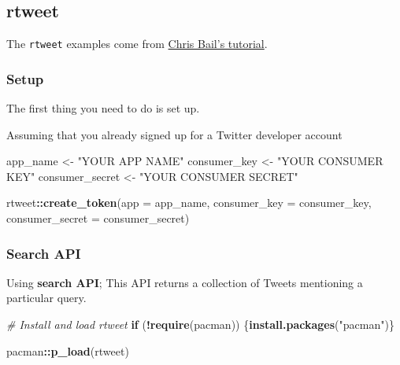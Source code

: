 \documentclass[
]{book}
\newenvironment{Shaded}{\begin{snugshade}}{\end{snugshade}}
\newcommand{\CommentTok}[1]{\textcolor[rgb]{0.56,0.35,0.01}{\textit{#1}}}
\newcommand{\ControlFlowTok}[1]{\textcolor[rgb]{0.13,0.29,0.53}{\textbf{#1}}}
\newcommand{\DataTypeTok}[1]{\textcolor[rgb]{0.13,0.29,0.53}{#1}}
\newcommand{\KeywordTok}[1]{\textcolor[rgb]{0.13,0.29,0.53}{\textbf{#1}}}
\newcommand{\NormalTok}[1]{#1}
\newcommand{\OperatorTok}[1]{\textcolor[rgb]{0.81,0.36,0.00}{\textbf{#1}}}
\newcommand{\StringTok}[1]{\textcolor[rgb]{0.31,0.60,0.02}{#1}}
\begin{document}
\hypertarget{rtweet}{%
\subsection{rtweet}\label{rtweet}}

The \texttt{rtweet} examples come from \href{https://cbail.github.io/SICSS_APIs_markdown.html}{Chris Bail's tutorial}.

\hypertarget{setup-5}{%
\subsubsection{Setup}\label{setup-5}}

The first thing you need to do is set up.

Assuming that you already signed up for a Twitter developer account

\begin{Shaded}
\begin{Highlighting}[]
\NormalTok{app\_name \textless{}{-}}\StringTok{ "YOUR APP NAME"}
\NormalTok{consumer\_key \textless{}{-}}\StringTok{ "YOUR CONSUMER KEY"}
\NormalTok{consumer\_secret \textless{}{-}}\StringTok{ "YOUR CONSUMER SECRET"}

\NormalTok{rtweet}\OperatorTok{::}\KeywordTok{create\_token}\NormalTok{(}\DataTypeTok{app =}\NormalTok{ app\_name, }
                     \DataTypeTok{consumer\_key =}\NormalTok{ consumer\_key, }
                     \DataTypeTok{consumer\_secret =}\NormalTok{ consumer\_secret)}
\end{Highlighting}
\end{Shaded}

\hypertarget{search-api}{%
\subsubsection{Search API}\label{search-api}}

Using \textbf{search API}; This API returns a collection of Tweets mentioning a particular query.

\begin{Shaded}
\begin{Highlighting}[]
\CommentTok{\# Install and load rtweet }
\ControlFlowTok{if}\NormalTok{ (}\OperatorTok{!}\KeywordTok{require}\NormalTok{(pacman)) \{}\KeywordTok{install.packages}\NormalTok{(}\StringTok{"pacman"}\NormalTok{)\}}

\NormalTok{pacman}\OperatorTok{::}\KeywordTok{p\_load}\NormalTok{(rtweet)}
\end{Highlighting}
\end{Shaded}
\end{document}
